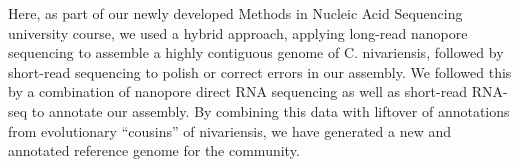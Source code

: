 Here, as part of our newly developed Methods in Nucleic Acid Sequencing university course, we used a hybrid approach, applying long-read nanopore sequencing to assemble a highly contiguous genome of C. nivariensis, followed by short-read sequencing to polish or correct errors in our assembly. We followed this by a combination of nanopore direct RNA sequencing as well as short-read RNA-seq to annotate our assembly. By combining this data with liftover of annotations from evolutionary “cousins” of nivariensis, we have generated a new and annotated reference genome for the community.


\begin{kframe}
\begin{alltt}
 \hlkwb{<-} 
 \hlkwb{<-} 
 \hlkwb{<-} 
 \hlkwb{<-} 
 \hlkwb{<-} 
 \hlkwb{<-} 


\end{alltt}
\end{kframe}
